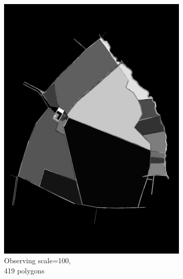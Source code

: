 \documentclass[12pt]{article}
\begin{document}
\begin{figure}[H]
	\begin{subfigure}[b]{.3\textwidth}
		\centering
		\includegraphics[width=1\linewidth]{images/polygon_recovery/felzenswalb2_scale100_region961.png}  
		\caption{Observing scale=100, \\ 419 polygons}
	\end{subfigure}
	\begin{subfigure}[b]{.3\textwidth}
		\centering

\end{subfigure}
\end{figure}
\end{document}
